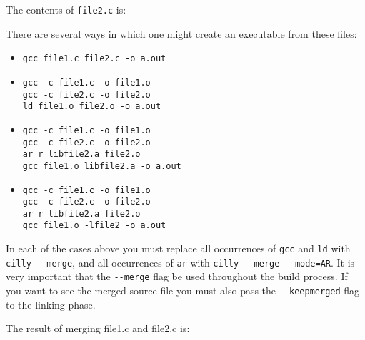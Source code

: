 \documentclass[letterpaper]{article}
\def\t#1{{\tt #1}}
\begin{document}
 The contents of \t{file2.c} is:


 There are several ways in which one might create an executable from these
files:
\begin{itemize}
\item
\begin{verbatim}
gcc file1.c file2.c -o a.out
\end{verbatim}

\item 
\begin{verbatim}
gcc -c file1.c -o file1.o
gcc -c file2.c -o file2.o
ld file1.o file2.o -o a.out
\end{verbatim}

\item 
\begin{verbatim}
gcc -c file1.c -o file1.o
gcc -c file2.c -o file2.o
ar r libfile2.a file2.o
gcc file1.o libfile2.a -o a.out
\end{verbatim}

\item 
\begin{verbatim}
gcc -c file1.c -o file1.o
gcc -c file2.c -o file2.o
ar r libfile2.a file2.o
gcc file1.o -lfile2 -o a.out
\end{verbatim}
\end{itemize}

 In each of the cases above you must replace all occurrences of \t{gcc} and
\t{ld} with \t{cilly -{}-merge}, and all occurrences of \t{ar} with \t{cilly
-{}-merge -{}-mode=AR}. It is very important that the \t{-{}-merge} flag be used
throughout the build process. If you want to see the merged source file you
must also pass the \t{-{}-keepmerged} flag to the linking phase. 

 The result of merging file1.c and file2.c is:
\end{document}
